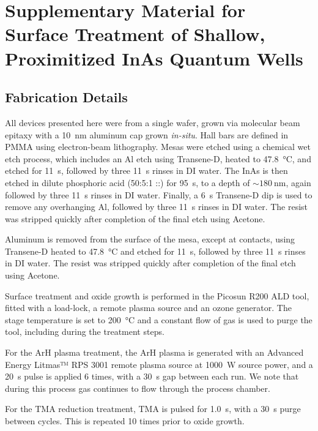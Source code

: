 
\chapter{Supplementary Material for Surface Treatment of Shallow, Proximitized InAs Quantum Wells}
\section{Fabrication Details}
All devices presented here were from a single wafer, grown via molecular beam epitaxy with a \SI{10}{\nano\meter} aluminum cap grown \emph{in-situ}. Hall bars are defined in PMMA using electron-beam lithography. Mesas were etched using a chemical wet etch process, which includes an Al etch using Transene-D, heated to \SI{47.8}{\celsius}, and etched for \SI{11}{\second}, followed by three \SI{11}{\second} rinses in DI water. The InAs is then etched in dilute phosphoric acid (50:5:1 ::) for \SI{95}{\second}, to a depth of $\sim \SI{180}{\nano\meter}$, again followed by three \SI{11}{\second} rinses in DI water. Finally, a \SI{6}{\second} Transene-D dip is used to remove any overhanging Al, followed by three \SI{11}{\second} rinses in DI water. The resist was stripped quickly after completion of the final etch using Acetone.

Aluminum is removed from the surface of the mesa, except at contacts, using Transene-D heated to \SI{47.8}{\celsius} and etched for \SI{11}{\second}, followed by three \SI{11}{\second} rinses in DI water. The resist was stripped quickly after completion of the final etch using Acetone.

Surface treatment and oxide growth is performed in the Picosun R200 ALD tool, fitted with a load-lock, a remote plasma source and an ozone generator. The stage temperature is set to \SI{200}{\celsius} and a constant flow of  gas is used to purge the tool, including during the treatment steps.

For the ArH plasma treatment, the ArH plasma is generated with an Advanced Energy Litmas™ RPS 3001 remote plasma source at \SI{1000}{\watt} source power, and a \SI{20}{\second} pulse is applied 6 times, with a \SI{30}{\second} gap between each run. We note that during this process  gas continues to flow through the process chamber.

For the TMA reduction treatment, TMA is pulsed for \SI{1.0}{\second}, with a \SI{30}{\second} purge between cycles. This is repeated 10 times prior to oxide growth.

